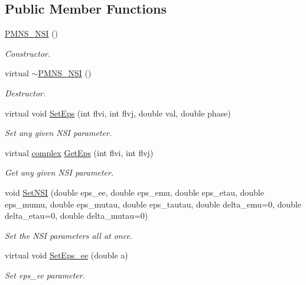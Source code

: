 \subsection*{Public Member Functions}
\begin{DoxyCompactItemize}
\item 
\hyperlink{classOscProb_1_1PMNS__NSI_ab41e79fb427c7a5662443acad31ce7e9}{P\+M\+N\+S\+\_\+\+N\+SI} ()
\begin{DoxyCompactList}\small\item\em Constructor. \end{DoxyCompactList}\item 
virtual \hyperlink{classOscProb_1_1PMNS__NSI_aad1035cb0fb26994029c25b475ec3bde}{$\sim$\+P\+M\+N\+S\+\_\+\+N\+SI} ()
\begin{DoxyCompactList}\small\item\em Destructor. \end{DoxyCompactList}\item 
virtual void \hyperlink{classOscProb_1_1PMNS__NSI_a87c508149ea36b6de493a6817247a0ea}{Set\+Eps} (int flvi, int flvj, double val, double phase)
\begin{DoxyCompactList}\small\item\em Set any given N\+SI parameter. \end{DoxyCompactList}\item 
virtual \hyperlink{classOscProb_1_1PMNS__Base_ae86ec4718808ce9d02e5f5b4226714ab}{complex} \hyperlink{classOscProb_1_1PMNS__NSI_aac8925ae248f737fe7c3afb12f511534}{Get\+Eps} (int flvi, int flvj)
\begin{DoxyCompactList}\small\item\em Get any given N\+SI parameter. \end{DoxyCompactList}\item 
void \hyperlink{classOscProb_1_1PMNS__NSI_ae8829af10bc4051e8c74c8b1bc81c88c}{Set\+N\+SI} (double eps\+\_\+ee, double eps\+\_\+emu, double eps\+\_\+etau, double eps\+\_\+mumu, double eps\+\_\+mutau, double eps\+\_\+tautau, double delta\+\_\+emu=0, double delta\+\_\+etau=0, double delta\+\_\+mutau=0)
\begin{DoxyCompactList}\small\item\em Set the N\+SI parameters all at once. \end{DoxyCompactList}\item 
virtual void \hyperlink{classOscProb_1_1PMNS__NSI_a13ecb89c4d43924d23833a9e930f50e0}{Set\+Eps\+\_\+ee} (double a)
\begin{DoxyCompactList}\small\item\em Set eps\+\_\+ee parameter. \end{DoxyCompactList}\item 

\end{DoxyCompactItemize}
